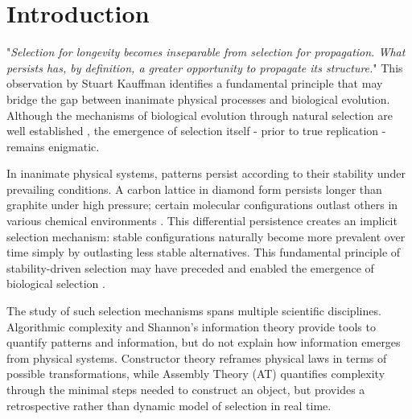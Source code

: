 \documentclass[preprint,12pt]{elsarticle}
\begin{document}

\section{Introduction}

"\textit{Selection for longevity becomes inseparable from selection for propagation. What persists has, by definition, a greater opportunity to propagate its structure.}" This observation by Stuart Kauffman \cite{kauffman1995home} identifies a fundamental principle that may bridge the gap between inanimate physical processes and biological evolution. Although the mechanisms of biological evolution through natural selection are well established \cite{fisher1930genetical}, the emergence of selection itself - prior to true replication - remains enigmatic.

In inanimate physical systems, patterns persist according to their stability under prevailing conditions. A carbon lattice in diamond form persists longer than graphite under high pressure; certain molecular configurations outlast others in various chemical environments \cite{davies2006goldilocks}. This differential persistence creates an implicit selection mechanism: stable configurations naturally become more prevalent over time simply by outlasting less stable alternatives. This fundamental principle of stability-driven selection may have preceded and enabled the emergence of biological selection \cite{hordijk2012autocatalytic, nghe2015prebiotic}.

The study of such selection mechanisms spans multiple scientific disciplines. Algorithmic complexity \cite{kolmogorov1965complexity, chaitin1977algorithmic, solomonoff1964formal} and Shannon's information theory \cite{shannon1948mathematical} provide tools to quantify patterns and information, but do not explain how information emerges from physical systems. Constructor theory \cite{deutsch2013constructor} reframes physical laws in terms of possible transformations, while Assembly Theory (AT) \cite{walker2023nature} quantifies complexity through the minimal steps needed to construct an object, but provides a retrospective rather than dynamic model of selection in real time.
\end{document}
